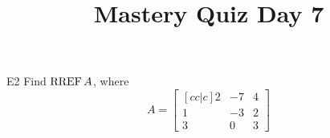 \documentclass{sbgLAquiz}
\title{Mastery Quiz Day 7 }
\begin{document}
\begin{problem}{E2}
Find \(\operatorname{RREF} A\), where
\[
  A =
  \begin{bmatrix}[cc|c]
    2 & -7 & 4 \\
    1 & -3 & 2 \\
    3 & 0 & 3
  \end{bmatrix}
\]
\end{problem}
\end{document}
